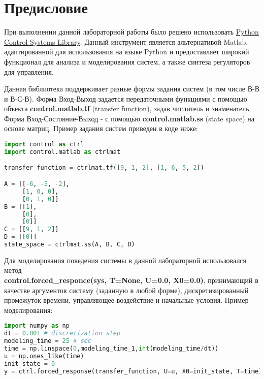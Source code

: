 \tableofcontents

\section*{Предисловие}
\indent
При выполнении данной лабораторной работы было решено использовать 
\href{https://python-control.readthedocs.io/en/0.9.4/}{Python Control Systems Library}.
Данный инструмент является альтернативой Matlab, адаптированной для использования на 
языке Python и предоставляет широкий функционал для анализа и моделирования систем,
а также синтеза регуляторов для управления.

Данная библиотека поддерживает разные формы задания систем (в том числе В-В и В-С-В).
Форма Вход-Выход задается передаточными функциями с помощью объекта 
\textbf{control.matlab.tf} (transfer function), задав числитель и знаменатель. Форма Вход-Состояние-Выход - с помощью 
\textbf{control.matlab.ss} (state space) на основе матриц. Пример задания систем приведен в коде ниже:

\begin{lstlisting}[language=Python]
import control as ctrl
import control.matlab as ctrlmat

transfer_function = ctrlmat.tf([9, 1, 2], [1, 6, 5, 2])

A = [[-6, -5, -2],
     [1, 0, 0],
     [0, 1, 0]]
B = [[1],
     [0],
     [0]]
C = [[9, 1, 2]]
D = [[0]]
state_space = ctrlmat.ss(A, B, C, D)
\end{lstlisting}

Для моделирования поведения системы в данной лабораторной использовался метод \\ 
\textbf{control.forced\_responce(sys, T=None, U=0.0, X0=0.0)}, принимающий в качестве 
аргументов систему (заданную в любой форме), дискретизированный промежуток времени, управляющее воздействие и начальные условия.
Пример моделирования:

\begin{lstlisting}[language=Python]
import numpy as np
dt = 0.001 # discretization step
modeling_time = 25 # sec
time = np.linspace(0,modeling_time_1,int(modeling_time/dt))
u = np.ones_like(time)
init_state = 0
y = ctrl.forced_response(transfer_function, U=u, X0=init_state, T=time).outputs
\end{lstlisting}
\pagebreak

